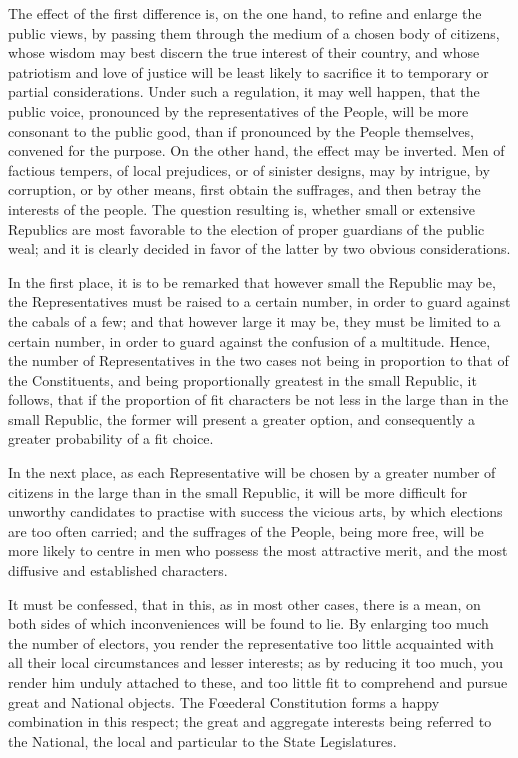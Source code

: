 The effect of the first difference is, on the one hand, to refine and
enlarge the public views, by passing them through the medium of a
chosen body of citizens, whose wisdom may best discern the true
interest of their country, and whose patriotism and love of justice
will be least likely to sacrifice it to temporary or partial
considerations. Under such a regulation, it may well happen, that the
public voice, pronounced by the representatives of the People, will be
more consonant to the public good, than if pronounced by the People
themselves, convened for the purpose. On the other hand, the effect
may be inverted. Men of factious tempers, of local prejudices, or of
sinister designs, may by intrigue, by corruption, or by other means,
first obtain the suffrages, and then betray the interests of the
people. The question resulting is, whether small or extensive
Republics are most favorable to the election of proper guardians of
the public weal; and it is clearly decided in favor of the latter by
two obvious considerations.

In the first place, it is to be remarked that however small the
Republic may be, the Representatives must be  raised to a
certain number, in order to guard against the cabals of a few; and
that however large it may be, they must be limited to a certain
number, in order to guard against the confusion of a multitude. Hence,
the number of Representatives in the two cases not being in proportion
to that of the Constituents, and being proportionally greatest in the
small Republic, it follows, that if the proportion of fit characters
be not less in the large than in the small Republic, the former will
present a greater option, and consequently a greater probability of a
fit choice.

In the next place, as each Representative will be chosen by a greater
number of citizens in the large than in the small Republic, it will be
more difficult for unworthy candidates to practise with success the
vicious arts, by which elections are too often carried; and the
suffrages of the People, being more free, will be more likely to
centre in men who possess the most attractive merit, and the most
diffusive and established characters.

It must be confessed, that in this, as in most other cases, there is a
mean, on both sides of which inconveniences will be found to lie. By
enlarging too much the number of electors, you render the
representative too little acquainted with all their local
circumstances and lesser interests; as by reducing it too much, you
render him unduly attached to these, and too little fit to comprehend
and pursue great and National objects. The F\oe ederal Constitution
forms a happy combination in this respect; the great and aggregate
interests being referred to the National, the local and particular to
the State Legislatures.

